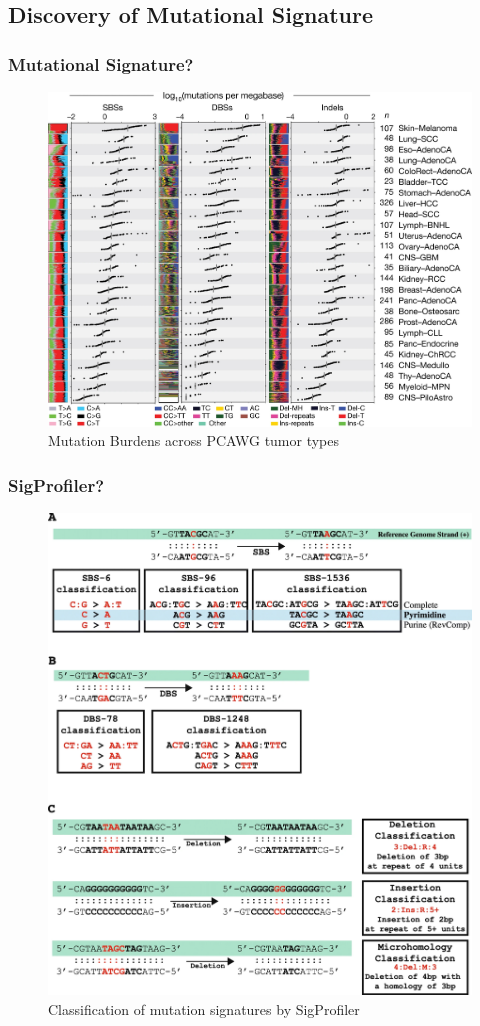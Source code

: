 \documentclass{beamer}
\begin{document}
    \subsection{Discovery of Mutational Signature}
    \begin{frame}
        \frametitle{Mutational Signature?}

        \begin{figure}
            \includegraphics[width=0.6 \linewidth]{figures/LungCancer/signatures.jpg}
            \caption{Mutation Burdens across PCAWG tumor types \protect\cite{signature1}}
        \end{figure}
    \end{frame}

    \begin{frame}
        \frametitle{SigProfiler?}

        \begin{figure}
            \includegraphics[width=0.4 \linewidth]{figures/Workflow/SigProfiler.jpg}
            \caption{Classification of mutation signatures by SigProfiler \protect\cite{SigProfiler1, SigProfiler2, SigProfiler3}}
        \end{figure}
    \end{frame}
\end{document}
